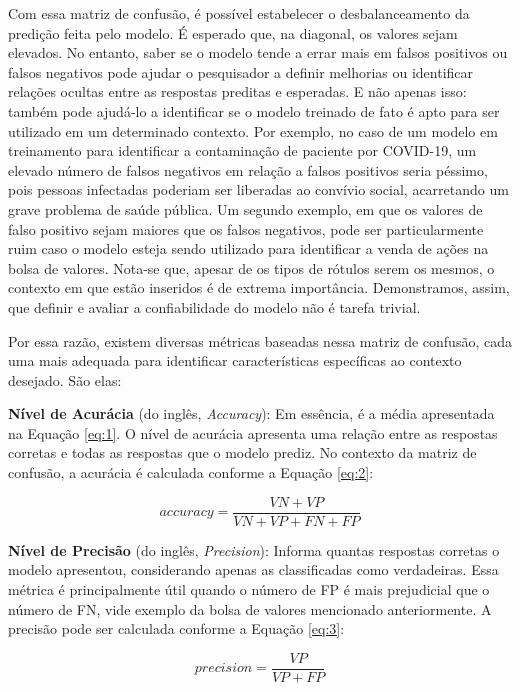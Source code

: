 

Com essa matriz de confusão, é possível estabelecer o desbalanceamento da predição feita pelo modelo. É esperado que, na diagonal, os valores sejam elevados. No entanto, saber se o modelo tende a errar mais em falsos positivos ou falsos negativos pode ajudar o pesquisador a definir melhorias ou identificar relações ocultas entre as respostas preditas e esperadas. E não apenas isso: também pode ajudá-lo a identificar se o modelo treinado de fato é apto para ser utilizado em um determinado contexto. Por exemplo, no caso de um modelo em treinamento para identificar a contaminação de paciente por COVID-19, um elevado número de falsos negativos em relação a falsos positivos seria péssimo, pois pessoas infectadas poderiam ser liberadas ao convívio social, acarretando um grave problema de saúde pública. Um segundo exemplo, em que os valores de falso positivo sejam maiores que os falsos negativos, pode ser particularmente ruim caso o modelo esteja sendo utilizado para identificar a venda de ações na bolsa de valores. Nota-se que, apesar de os tipos de rótulos serem os mesmos, o contexto em que estão inseridos é de extrema importância. Demonstramos, assim, que definir e avaliar a confiabilidade do modelo não é tarefa trivial.

Por essa razão, existem diversas métricas baseadas nessa matriz de confusão, cada uma mais adequada para identificar características específicas ao contexto desejado. São elas:

\textbf{Nível de Acurácia} (do inglês, \textit{Accuracy}): Em essência, é a média apresentada na Equação \ref{eq:1}. O nível de acurácia apresenta uma relação entre as respostas corretas e todas as respostas que o modelo prediz. No contexto da matriz de confusão, a acurácia é calculada conforme a Equação \ref{eq:2}:

\begin{equation}
    \label{eq:2}
    accuracy = \frac{VN+VP}{VN+VP+FN+FP}
\end{equation}

\textbf{Nível de Precisão} (do inglês, \textit{Precision}): Informa quantas respostas corretas o modelo apresentou, considerando apenas as classificadas como verdadeiras. Essa métrica é principalmente útil quando o número de FP é mais prejudicial que o número de FN, vide exemplo da bolsa de valores mencionado anteriormente. A precisão pode ser calculada conforme a Equação \ref{eq:3}:

\begin{equation}
    \label{eq:3}
    precision = \frac{VP}{VP+FP}
\end{equation}

